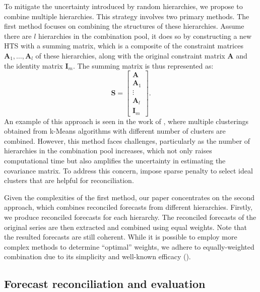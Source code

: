 \documentclass[a4paper,review,12pt,authoryear]{elsarticle}
\begin{document}
To mitigate the uncertainty introduced by random hierarchies, we propose to combine multiple hierarchies. This strategy involves two primary methods. The first method focuses on combining the structures of these hierarchies. Assume there are $l$ hierarchies in the combination pool, it does so by constructing a new HTS with a summing matrix, which is a composite of the constraint matrices $\boldsymbol{A}_1, \dots, \boldsymbol{A}_l$ of  these hierarchies, along with the original constraint matrix $\boldsymbol{A}$ and the identity matrix $\boldsymbol{I}_m$. The summing matrix is thus represented as: 
\[
  \boldsymbol{S} = \begin{bmatrix}
    \boldsymbol{A} \\ \boldsymbol{A}_1 \\ \vdots \\ \boldsymbol{A}_l \\ \boldsymbol{I}_m
  \end{bmatrix}.  
\] An example of this approach is seen in the work of \cite{pangHierarchicalElectricityTime2022}, where multiple clusterings obtained from k-Means algorithms with different number of clusters are combined. 
However, this method faces challenges, particularly as the number of hierarchies in the combination pool increases, which not only raises computational time but also amplifies the uncertainty in estimating the covariance matrix.
To address this concern, \cite{pangHierarchicalElectricityTime2022} impose sparse penalty to select ideal clusters that are helpful for reconciliation.

Given the complexities of the first method, our paper concentrates on the second approach, which combines reconciled forecasts from different hierarchies. Firstly, we produce reconciled forecasts for each hierarchy. The reconciled forecasts of the original series are then extracted and combined using equal weights. Note that the resulted forecasts are still coherent. While it is possible to employ more complex methods to determine ``optimal'' weights, we adhere to equally-weighted combination due to its simplicity and well-known efficacy (\citealp{wangForecastCombinations50year2022}).

\subsection{Forecast reconciliation and evaluation}
\label{sec:reconciliation}
\end{document}
